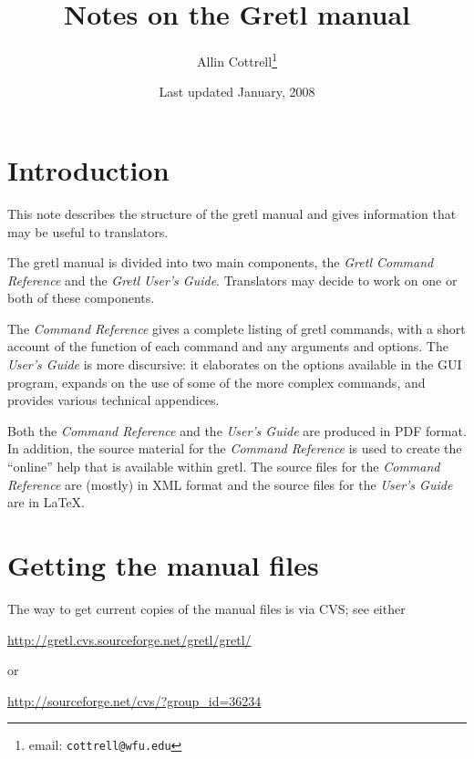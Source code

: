 \documentclass{article}
\begin{document}
\title{Notes on the Gretl manual}
\author{Allin Cottrell\thanks{email: \texttt{cottrell@wfu.edu}}}
\date{Last updated January, 2008}

\maketitle

\setcounter{tocdepth}{1}
\tableofcontents

\section{Introduction}

This note describes the structure of the \textsf{gretl} manual and
gives information that may be useful to translators.

The \textsf{gretl} manual is divided into two main components, the
\textit{Gretl Command Reference} and the \textit{Gretl User's Guide}.
Translators may decide to work on one or both of these components.

The \textit{Command Reference} gives a complete listing of
\textsf{gretl} commands, with a short account of the function of each
command and any arguments and options.  The \textit{User's Guide} is
more discursive: it elaborates on the options available in the GUI
program, expands on the use of some of the more complex commands, and
provides various technical appendices.

Both the \textit{Command Reference} and the \textit{User's Guide} are
produced in PDF format.  In addition, the source material for the
\textit{Command Reference} is used to create the ``online'' help that
is available within \textsf{gretl}.  The source files for the
\textit{Command Reference} are (mostly) in XML format and the source
files for the \textit{User's Guide} are in \LaTeX.

\section{Getting the manual files}
\label{getit}

The way to get current copies of the manual files is via CVS; see
either 
%
\begin{center}
\url{http://gretl.cvs.sourceforge.net/gretl/gretl/}
\end{center}
%
or 
%
\begin{center}
\url{http://sourceforge.net/cvs/?group_id=36234}
\end{center}
\end{document}
